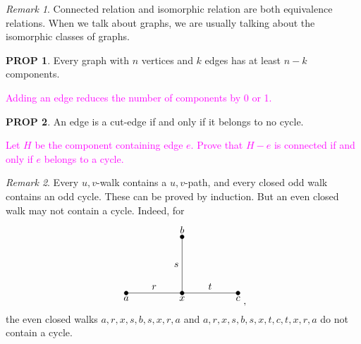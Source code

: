 \documentclass[11pt]{article}
\theoremstyle{definition}
\theoremstyle{dotles}
\theoremstyle{dotless}
\newtheorem{proposition}{PROP}[section]
\theoremstyle{remark}
\newtheorem{remark}{Remark}
\begin{document}
\begin{remark}
Connected relation and isomorphic relation are both equivalence relations. When we talk about graphs, we are usually talking about the isomorphic classes of graphs.
\end{remark}

\begin{proposition}
Every graph with $n$ vertices and $k$ edges has at least $n-k$ components.
\end{proposition}
\textcolor{magenta}{Adding an edge reduces the number of components by 0 or 1.}

\begin{proposition}
An edge is a cut-edge if and only if it belongs to no cycle.
\end{proposition}
\textcolor{magenta}{Let $H$ be the component containing edge $e$. Prove that $H-e$ is connected if and only if $e$ belongs to a cycle.}

\begin{remark}
Every $u,v$-walk contains a $u,v$-path, and every closed odd walk contains an odd cycle. These can be proved by induction. But an even closed walk may not contain a cycle. Indeed, for
\[\begin{tikzpicture}
\filldraw(-2,0)circle(2pt)node[align=left,below]{$a$}--node[above]{$r$}++(2,0)circle(2pt)node[align=center,below]{$x$}--node[above]{$t$}++(2,0)(2,0)circle(2pt)node[align=right,below]{$c$};
\filldraw(0,2)circle(2pt)node[align=left,above]{$b$}--node[left]{$s$}(0,0);
\end{tikzpicture},\]
the even closed walks $a,r,x,s,b,s,x,r,a$ and $a,r,x,s,b,s,x,t,c,t,x,r,a$ do not contain a cycle.
\end{remark}
\end{document}
